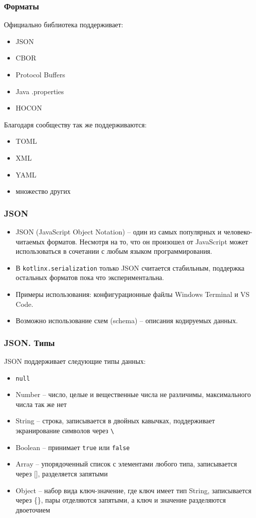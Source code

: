 \documentclass[aspectratio=169]{beamer}
\begin{document}
\begin{frame}
    \frametitle{Форматы}
    Официально библиотека поддерживает:
    \begin{itemize}
        \item JSON
        \item CBOR
        \item Protocol Buffers
        \item Java .properties
        \item HOCON
    \end{itemize}
    Благодаря сообществу так же поддерживаются:
    \begin{itemize}
        \item TOML
        \item XML
        \item YAML
        \item множество других
    \end{itemize}
\end{frame}

\begin{frame}
    \frametitle{JSON}

    \begin{itemize}
        \item JSON (JavaScript Object Notation) -- один из самых популярных и человеко-читаемых форматов.
              Несмотря на то, что он произошел от JavaScript может использоваться в сочетании с любым языком программирования.
        \item В \texttt{kotlinx.serialization} только JSON считается стабильным, поддержка остальных форматов пока что экспериментальна.
        \item Примеры использования: конфигурационные файлы Windows Terminal и VS Code.
        \item Возможно использование схем (schema) -- описания кодируемых данных.
    \end{itemize}
\end{frame}

\begin{frame}
    \frametitle{JSON. Типы}
    JSON поддерживает следующие типы данных:
    \begin{itemize}
        \item \texttt{null}
        \item Number -- число, целые и вещественные числа не различимы, максимального числа так же нет
        \item String -- строка, записывается в двойных кавычках, поддерживает экранирование символов через \texttt{\textbackslash}
        \item Boolean -- принимает \texttt{true} или \texttt{false}
        \item Array -- упорядоченный список с элементами любого типа, записывается через [], разделяется запятыми
        \item Object -- набор вида ключ-значение, где ключ имеет тип String, записывается через \{\}, пары отделяются запятыми, а ключ и значение разделяются двоеточием
    \end{itemize}
\end{frame}
\end{document}
